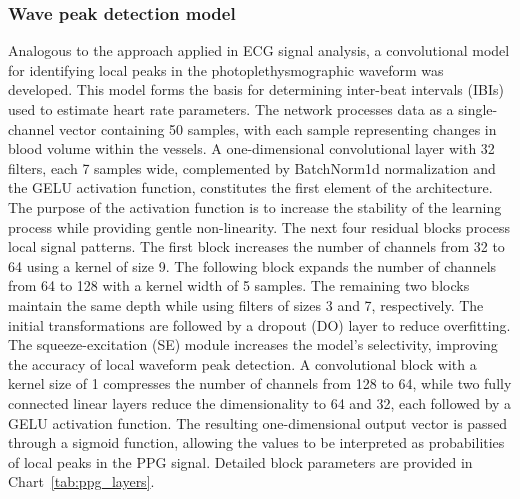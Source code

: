 \documentclass[journal]{IEEEtran}
\begin{document}
\subsubsection{Wave peak detection model}
Analogous to the approach applied in ECG signal analysis, a convolutional model for identifying local peaks in the photoplethysmographic waveform was developed. This model forms the basis for determining inter-beat intervals (IBIs) used to estimate heart rate parameters. The network processes data as a single-channel vector containing 50 samples, with each sample representing changes in blood volume within the vessels.
A one-dimensional convolutional layer with 32 filters, each 7 samples wide, complemented by BatchNorm1d normalization and the GELU activation function, constitutes the first element of the architecture. The purpose of the activation function is to increase the stability of the learning process while providing gentle non-linearity. The next four residual blocks process local signal patterns. The first block increases the number of channels from 32 to 64 using a kernel of size 9. The following block expands the number of channels from 64 to 128 with a kernel width of 5 samples. The remaining two blocks maintain the same depth while using filters of sizes 3 and 7, respectively. The initial transformations are followed by a dropout (DO) layer to reduce overfitting.
\newpage
The squeeze-excitation (SE) module increases the model’s selectivity, improving the accuracy of local waveform peak detection. A convolutional block with a kernel size of 1 compresses the number of channels from 128 to 64, while two fully connected linear layers reduce the dimensionality to 64 and 32, each followed by a GELU activation function. The resulting one-dimensional output vector is passed through a sigmoid function, allowing the values to be interpreted as probabilities of local peaks in the PPG signal. Detailed block parameters are provided in Chart~\ref{tab:ppg_layers}.
\end{document}
